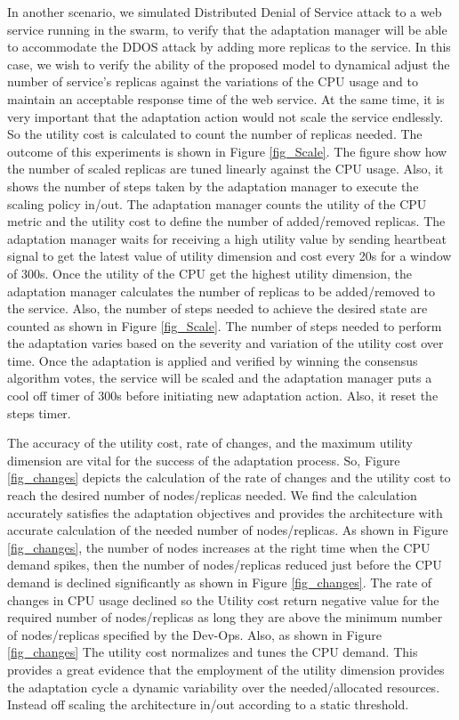 \documentclass[graybox]{svmult}
\begin{document}
In another scenario, we simulated Distributed Denial of Service attack to a web service running in the swarm, to verify that the adaptation manager will be able to accommodate the DDOS attack by adding more replicas to the service. In this case, we wish to verify the ability of the proposed model to dynamical adjust the number of service's replicas against the variations of the CPU usage and to maintain an acceptable response time of the web service. At the same time, it is very important that the adaptation action would not scale the service endlessly. So the utility cost is calculated to count the number of replicas needed. The outcome of this experiments is shown in Figure \ref{fig_Scale}. The figure show how the number of scaled replicas are tuned linearly against the CPU usage. Also, it shows the number of steps taken by the adaptation manager to execute the scaling policy in/out. The adaptation manager counts the utility of the CPU metric and the utility cost to define the number of added/removed replicas. The adaptation manager waits for receiving a high utility value by sending heartbeat signal to get the latest value of utility dimension and cost every 20s for a window of 300s. Once the utility of the CPU get the highest utility dimension, the adaptation manager calculates the number of replicas to be added/removed to the service. Also, the number of steps needed to achieve the desired state are counted as shown in Figure \ref{fig_Scale}. The number of steps needed to perform the adaptation varies based on the severity and variation of the utility cost over time. Once the adaptation is applied and verified by winning the consensus algorithm votes, the service will be scaled and the adaptation manager puts a cool off timer of 300s before initiating new adaptation action. Also, it reset the steps timer. 

The accuracy of the utility cost, rate of changes, and the maximum utility dimension are vital for the success of the adaptation process. So, Figure \ref{fig_changes} depicts the calculation of the rate of changes and the utility cost to reach the desired number of nodes/replicas needed. We find the calculation accurately satisfies the adaptation objectives and provides the architecture with accurate calculation of the needed number of nodes/replicas. As shown in Figure \ref{fig_changes}, the number of nodes increases at the right time when the CPU demand spikes, then the number of nodes/replicas reduced just before the CPU demand is declined significantly as shown in Figure \ref{fig_changes}. The rate of changes in CPU usage declined so the Utility cost return negative value for the required number of nodes/replicas as long they are above the minimum number of nodes/replicas specified by the Dev-Ops. Also, as shown in Figure \ref{fig_changes} The utility cost normalizes and tunes the CPU demand. This provides a great evidence that the employment of the utility dimension provides the adaptation cycle a dynamic variability over the needed/allocated resources. Instead off scaling the architecture in/out according to a static threshold. 
\end{document}
